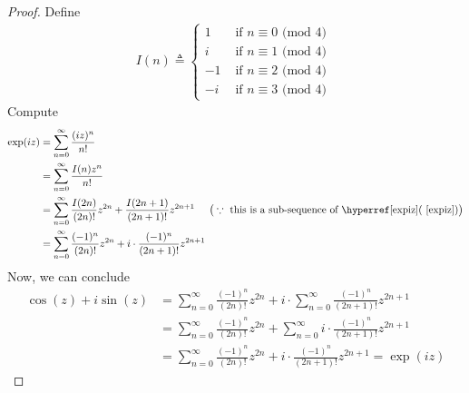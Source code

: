 \documentclass{report}
\begin{document}
\begin{proof}
Define 
\begin{align*}
I(n)\triangleq \begin{cases}
  1& \text{ if $n \equiv 0$ (mod $4$) }\\
  i& \text{ if $n \equiv 1$ (mod $4$) }\\
  -1& \text{ if $n \equiv 2$ (mod $4$) }\\
  -i& \text{ if $n \equiv 3$ (mod $4$) }
\end{cases}
\end{align*}
Compute 
\begin{align}
\label{expiz}
\exp(iz)&=\sum_{n=0}^\infty \frac{(iz)^n}{n!}\notag\\ 
&=\sum_{n=0}^{\infty} \frac{I(n)z^n}{n!}\\
&=\sum_{n=0}^{\infty} \frac{I(2n)}{(2n)!}z^{2n}+\frac{I(2n+1)}{(2n+1)!}z^{2n+1}\hspace{0.5cm}\big(\because \text{ this is a sub-sequence of \myref{(}{expiz})}\big)\notag\\
&= \sum_{n=0}^{\infty} \frac{(-1)^{n}}{(2n)!}z^{2n}+ i\cdot \frac{(-1)^n}{(2n+1)!}z^{2n+1} \notag
\end{align}
Now, we can conclude 
\begin{align*}
\cos (z)+i \sin (z)&= \sum_{n=0}^{\infty}\frac{(-1)^{n}}{(2n)!}z^{2n} + i \cdot \sum_{n=0}^{\infty} \frac{(-1)^{n}}{(2n+1)!}z^{2n+1}\\
&=\sum_{n=0}^{\infty}\frac{(-1)^{n}}{(2n)!}z^{2n} +  \sum_{n=0}^{\infty} i\cdot  \frac{(-1)^{n}}{(2n+1)!}z^{2n+1} \\
&=\sum_{n=0}^{\infty}\frac{(-1)^{n}}{(2n)!}z^{2n} +  i\cdot  \frac{(-1)^{n}}{(2n+1)!}z^{2n+1} =\exp (iz)
\end{align*}
\end{proof}
\end{document}
